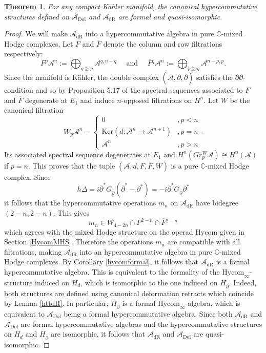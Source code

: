 \documentclass[a4paper]{amsart}
\newtheorem{theo}{Theorem}[section]
\theoremstyle{definition}
\theoremstyle{theorem}
\newcommand{\CC}{\mathbb{C}}
\newcommand{\Aa}{\mathcal{A}}
\newcommand{\Ker}{\mathrm{Ker}}
\newcommand{\ov}{\overline}
\newcommand{\del}{\partial}
\newcommand{\delb}{{\overline\partial}}
\newcommand{\Hycom}{{\mathrm{Hycom}}}
\newcommand{\Dol}{\mathrm{Dol}}
\newcommand{\dR}{\mathrm{dR}}
\begin{document}
\begin{theo}\label{chineseformality}
For any compact Kähler manifold, the canonical hypercommutative structures defined on $\Aa_{\Dol}$ and $\Aa_{\dR}$
are formal and quasi-isomorphic.
\end{theo}
\begin{proof}
We will make $\Aa_{\dR}$ into a hypercommutative algebra in pure $\CC$-mixed Hodge complexes. 
Let $F$ and $\ov{F}$ denote the column and row filtrations respectively:
\[F^p\Aa^n:=\bigoplus_{q\geq p}\Aa^{q,n-q}\quad\text{ and }\quad \ov{F}{}^q\Aa^n:=\bigoplus_{p\geq q}\Aa^{n-p,p}.\]
Since the manifold is Kähler, the double complex $(\Aa,\del,\delb)$ satisfies the $\del\delb$-condition and so by 
Proposition 5.17 of \cite{DGMS} the spectral sequences associated to $F$ and $\ov{F}$ degenerate at $E_1$ and 
induce $n$-opposed filtrations on $H^n$. 
Let $W$ be the canonical filtration
\[
W_p\Aa^n=\left\{ 
\begin{array}{ll}
0&,p<n\\
\Ker(d:\Aa^n\to \Aa^{n+1})&,p=n\\
\Aa^n&,p>n
\end{array}
\right..
\]
Its associated spectral sequence degenerates at $E_1$ and $H^n(Gr_p^W\Aa)\cong H^n(\Aa)$ if $p=n$. 
This proves that the tuple $(\Aa,d,F,\ov{F},W)$ is a pure $\CC$-mixed Hodge complex.
Since 
\[h\Delta=i\delb^* G_\delb (\delb^*-\del^*)=-i \delb^* G_\delb \del^*\]
it follows that the hypercommutative operations $m_n$ on $\Aa_{\dR}$ have bidegree $(2-n,2-n)$. 
This gives \[m_n\in W_{4-2n}\cap F^{2-n}\cap \ov{F}{}^{2-n}\]
which agrees with the mixed Hodge structure on the operad $\Hycom$ given in Section \ref{HycomMHS}. Therefore the operations $m_n$ are compatible with all filtrations,
making $\Aa_{\dR}$ into an hypercommutative algebra in pure $\CC$-mixed Hodge complexes. By Corollary \ref{hycomformal},
it follows that $\Aa_{\dR}$ is a formal hypercommutative algebra.
This is equivalent to the formality of the $\Hycom_\infty$-structure induced on $H_{d}$, which is isomorphic to 
the one induced on $H_\delb$. 
Indeed, both structures are defined using canonical deformation retracts which coincide by Lemma \ref{httdR}.
In particular, $H_\delb$ is a formal $\Hycom_\infty$-algebra, which is equivalent to $\Aa_{\Dol}$ being a formal hypercommutative algebra.
Since both $\Aa_{\dR}$ and $\Aa_{\Dol}$ are formal hypercommutative algebras and the hypercommutative structures on $H_d$ and $H_\delb$ are isomorphic, it follows that $\Aa_{\dR}$ and $\Aa_{\Dol}$ are quasi-isomorphic.
\end{proof}
\end{document}
